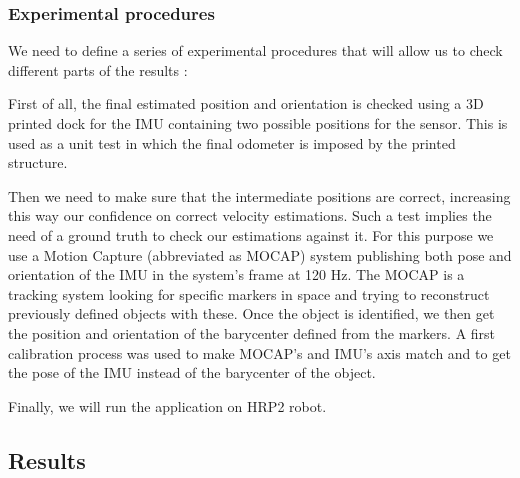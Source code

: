\subsubsection{Experimental procedures}

We need to define a series of experimental procedures that will allow us to check different parts of the results :

First of all, the final estimated position and orientation is checked using a 3D printed dock for the IMU containing two possible positions for the sensor.
This is used as a unit test in which the final odometer is imposed by the printed structure.

Then we need to make sure that the intermediate positions are correct, increasing this way our confidence on correct velocity estimations.
Such a test implies the need of a ground truth to check our estimations against it. For this purpose we use a Motion Capture (abbreviated as MOCAP) system publishing both
pose and orientation of the IMU in the system's frame at 120 Hz. The MOCAP is a tracking system looking for specific markers in space
and trying to reconstruct previously defined objects with these. Once the object is identified, we then get the position and orientation of the barycenter defined from the markers.
A first calibration process was used to make MOCAP's and IMU's axis match and to get the pose of the IMU instead of the barycenter of the object.

Finally, we will run the application on HRP2 robot.


\subsection{Results}